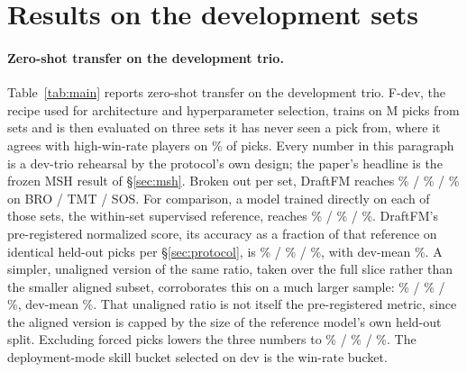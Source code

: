 \section{Results on the development sets}
\label{sec:results}
\FloatBarrier

\begin{table}[t]
  \centering
  \caption{Zero-shot top-1 agreement (\%) with high-win-rate players,
  deployment mode, forced picks included; 95\% cluster-bootstrap
  confidence intervals over drafts in parentheses. Sets: The Brothers'
  War (BRO), Teenage Mutant Ninja Turtles (TMT), Secrets of Strixhaven
  (SOS), and Marvel Super Heroes (MSH). F-full's dev-trio cells are never
  quoted, since it trains on those three sets.}
  \label{tab:main}
  \footnotesize
  \setlength{\tabcolsep}{2.4pt}
  \makebox[\textwidth][c]{}
\end{table}

\paragraph{Zero-shot transfer on the development trio.}
Table~\ref{tab:main} reports zero-shot transfer on the development trio.
F-dev, the recipe used for architecture and hyperparameter selection,
trains on \FdevPicks M picks from \FdevSets{} sets and is then evaluated
on three sets it has never seen a pick from, where it agrees with
high-win-rate players on \FdevDevMean\% of picks. Every number in this
paragraph is a dev-trio rehearsal by the protocol's own design; the
paper's headline is the frozen MSH result of \S\ref{sec:msh}. Broken out
per set, DraftFM reaches \FdevBro\% / \FdevTmt\% / \FdevSos\% on BRO /
TMT / SOS. For comparison, a model trained directly on each of those
sets, the within-set supervised reference, reaches \CeilBro\% /
\CeilTmt\% / \CeilSos\%.
DraftFM's pre-registered normalized score, its accuracy as a fraction of
that reference on identical held-out picks per \S\ref{sec:protocol}, is
\NormScoreBro\% / \NormScoreTmt\% / \NormScoreSos\%, with dev-mean
\NormScoreDevMean\%. A simpler, unaligned version of the same ratio,
taken over the full slice rather than the smaller aligned subset,
corroborates this on a much larger sample: \RatioBro\% / \RatioTmt\% /
\RatioSos\%, dev-mean \RatioDevMean\%. That unaligned ratio is not
itself the pre-registered metric, since the aligned version is capped by
the size of the reference model's own held-out split. Excluding forced
picks lowers the three numbers to \FdevBroNonForced\% /
\FdevTmtNonForced\% / \FdevSosNonForced\%. The deployment-mode skill
bucket selected on dev is the \DeployBucket{} win-rate bucket.

